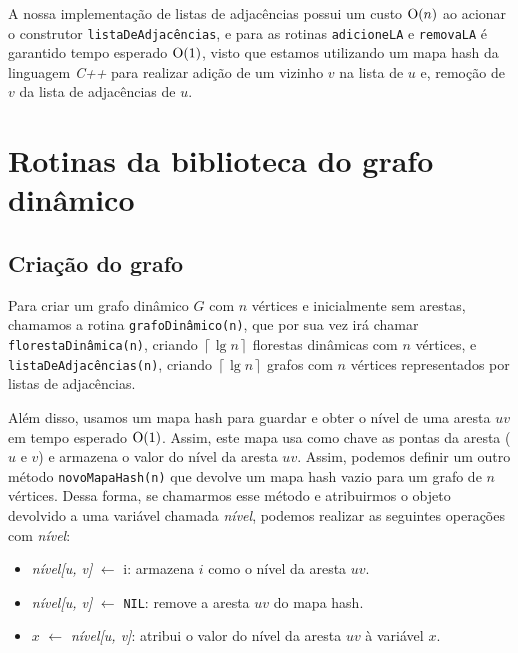 A nossa implementação \cite{chung2025} de listas de adjacências possui um custo $\mathrm{O}(n)$ ao acionar o construtor \texttt{listaDeAdjacências}, e para 
as rotinas \texttt{adicioneLA} e \texttt{removaLA} é garantido tempo esperado $\mathrm{O}(1)$, visto que estamos utilizando um mapa hash da linguagem \textit{C++} para realizar adição de um vizinho $v$ na lista de $u$ e, remoção de $v$ da lista de adjacências de $u$.

\section{Rotinas da biblioteca do grafo dinâmico}
\label{sec:dynamic-graph-routines}

\subsection{Criação do grafo}
\label{sec:dynamic-graph-creation}

Para criar um grafo dinâmico $G$ com $n$ vértices e inicialmente sem arestas, chamamos a rotina \texttt{grafoDinâmico(n)}, que por sua vez irá chamar \texttt{florestaDinâmica(n)}, criando $\left\lceil \lg n \right\rceil$ florestas dinâmicas com $n$ vértices, e \texttt{listaDeAdjacências(n)}, criando $\left\lceil \lg n \right\rceil$ grafos com $n$ vértices representados por listas de adjacências. 

Além disso, usamos um mapa hash para guardar e obter o nível de uma aresta $uv$ em tempo esperado $\mathrm{O}(1)$. Assim, este mapa usa como chave as pontas da aresta ($u$ e $v$) e armazena o valor do nível da aresta $uv$. Assim, podemos definir um outro método \texttt{novoMapaHash(n)} que devolve um mapa hash vazio para um grafo de $n$ vértices. Dessa forma, se chamarmos esse método e atribuirmos o objeto devolvido a uma variável chamada \textit{nível}, podemos realizar as seguintes operações com \textit{nível}:

\begin{itemize}
    \item \textit{nível[u, v]} $\leftarrow$ i: armazena $i$ como o nível da aresta $uv$. 
    
    \item \textit{nível[u, v]} $\leftarrow$ \texttt{NIL}: remove a aresta $uv$ do mapa hash.
    
    \item $x$ $\leftarrow$ \textit{nível[u, v]}: atribui o valor do nível da aresta $uv$ à variável $x$. 
\end{itemize}

